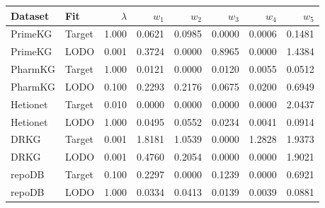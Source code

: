 \begin{tabular}{llrrrrrr}
\toprule
Dataset & Fit & $\lambda$ & $w_1$ & $w_2$ & $w_3$ & $w_4$ & $w_5$ \\
\midrule
PrimeKG & Target & 1.000 & 0.0621 & 0.0985 & 0.0000 & 0.0006 & 0.1481 \\
PrimeKG & LODO & 0.001 & 0.3724 & 0.0000 & 0.8965 & 0.0000 & 1.4384 \\
PharmKG & Target & 1.000 & 0.0121 & 0.0000 & 0.0120 & 0.0055 & 0.0512 \\
PharmKG & LODO & 0.100 & 0.2293 & 0.2176 & 0.0675 & 0.0200 & 0.6949 \\
Hetionet & Target & 0.010 & 0.0000 & 0.0000 & 0.0000 & 0.0000 & 2.0437 \\
Hetionet & LODO & 1.000 & 0.0495 & 0.0552 & 0.0234 & 0.0041 & 0.0914 \\
DRKG & Target & 0.001 & 1.8181 & 1.0539 & 0.0000 & 1.2828 & 1.9373 \\
DRKG & LODO & 0.001 & 0.4760 & 0.2054 & 0.0000 & 0.0000 & 1.9021 \\
repoDB & Target & 0.100 & 0.2297 & 0.0000 & 0.1239 & 0.0000 & 0.6921 \\
repoDB & LODO & 1.000 & 0.0334 & 0.0413 & 0.0139 & 0.0039 & 0.0881 \\
\bottomrule
\end{tabular}
